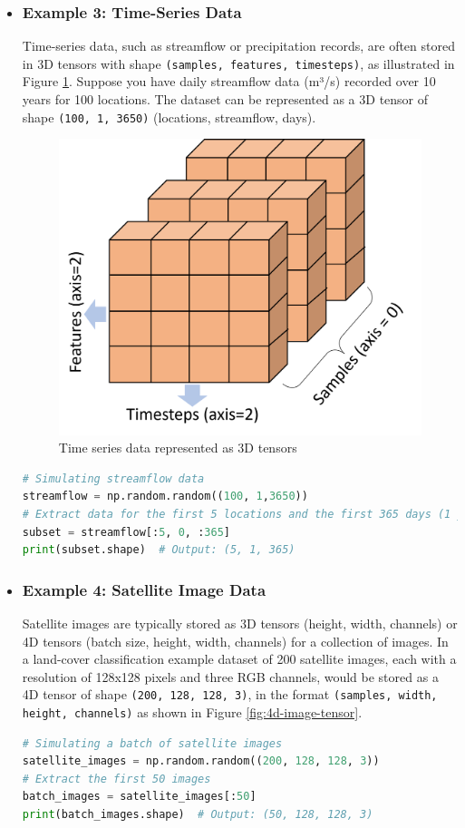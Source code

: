 \begin{itemize}
    \item \subsubsection{Example 3: Time-Series Data}
Time-series data, such as streamflow or precipitation records, are often stored in 3D tensors with shape \texttt{(samples, features, timesteps)}, as illustrated in Figure \ref{fig:ts_3d_data}.
Suppose you have daily streamflow data (m³/s) recorded over 10 years for 100 locations. The dataset can be represented as a 3D tensor of shape \texttt{(100, 1, 3650)} (locations, streamflow, days).

\begin{figure}
    \centering
    \includegraphics[width=0.5\linewidth]{images/samples-features-timesteps.png}
    \caption{Time series data represented as 3D tensors}
    \label{fig:ts_3d_data}
\end{figure}
\begin{lstlisting}[language=Python]
# Simulating streamflow data
streamflow = np.random.random((100, 1,3650))
# Extract data for the first 5 locations and the first 365 days (1 year)
subset = streamflow[:5, 0, :365]
print(subset.shape)  # Output: (5, 1, 365)
\end{lstlisting}
\end{itemize}

\begin{itemize}
    \item \subsubsection{Example 4: Satellite Image Data} 
    Satellite images are typically stored as 3D tensors (height, width, channels) or 4D tensors (batch size, height, width, channels) for a collection of images.
    In a land-cover classification example dataset of 200 satellite images, each with a resolution of 128x128 pixels and three RGB channels, would be stored as a 4D tensor of shape \texttt{(200, 128, 128, 3)}, in the format \texttt{(samples, width, height, channels)} as shown in Figure \ref{fig:4d-image-tensor}.
    \begin{lstlisting}[language=Python]
# Simulating a batch of satellite images
satellite_images = np.random.random((200, 128, 128, 3))
# Extract the first 50 images
batch_images = satellite_images[:50]
print(batch_images.shape)  # Output: (50, 128, 128, 3)
\end{lstlisting}
\end{itemize}

